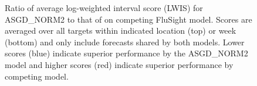 \begin{figure}[hbt!]
\begin{adjustwidth}{-1.2cm}{-1.5cm}
    \centering
    \end{adjustwidth}
    \caption{Ratio of average log-weighted interval score (LWIS) for ASGD\_NORM2 
    to that of on competing FluSight model. Scores are averaged
    over all targets within indicated location (top) or week (bottom) and 
    only include forecasts shared by both models. Lower scores (blue) indicate
    superior performance by the ASGD\_NORM2 model and higher scores (red)
    indicate superior performance by competing model.}
    \label{fig:state_and_date_lwis}
    
\end{figure}



